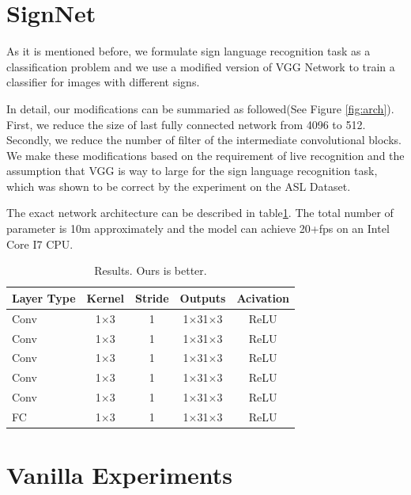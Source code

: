 \documentclass[10pt,twocolumn,letterpaper]{article}
\begin{document}

\section{SignNet}

As it is mentioned before, we formulate sign language recognition task as a classification problem and we use a modified version of VGG Network \cite{simonyan2014very} to train a classifier for images with different signs. 

In detail, our modifications can be summaried as followed(See Figure \ref{fig:arch}). First, we reduce the size of last fully connected network from 4096 to 512. Secondly, we reduce the number of filter of the intermediate convolutional blocks. We make these modifications based on the requirement of live recognition and the assumption that VGG is way to large for the sign language recognition task, which was shown to be correct by the experiment on the ASL Dataset.

The exact network architecture can be described in table\ref{table:arch}. The total number of parameter is 10m approximately and the model can achieve 20+fps on an Intel Core I7 CPU.  

\begin{table}[h]
\begin{center}
\begin{tabular}{|l|c|c|c|c|}
\hline
Layer Type & Kernel & Stride & Outputs & Acivation \\
\hline\hline
Conv & 1$\times$3 & 1 & 1$\times$31$\times$3 & ReLU\\
Conv & 1$\times$3 & 1 & 1$\times$31$\times$3 & ReLU\\
Conv & 1$\times$3 & 1 & 1$\times$31$\times$3 & ReLU\\
Conv & 1$\times$3 & 1 & 1$\times$31$\times$3 & ReLU\\
Conv & 1$\times$3 & 1 & 1$\times$31$\times$3 & ReLU\\
FC & 1$\times$3 & 1 & 1$\times$31$\times$3 & ReLU\\
\hline
\end{tabular}
\end{center}
\caption{Results.  Ours is better.}
\label{table:arch}
\end{table}



\section{Vanilla Experiments}
\end{document}
